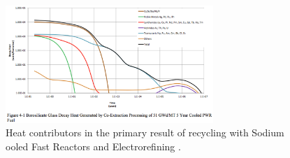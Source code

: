 \begin{figure}[htbp!]
  \begin{center}
    \includegraphics[width=0.7\textwidth]{./images/carter_coex_heat.eps}
  \end{center}
  \caption{Heat contributors in the primary result of recycling with Sodium 
    ooled Fast Reactors and Electrorefining \cite{carter_us_2011}.}
  \label{fig:carter_coex_heat}
\end{figure}
